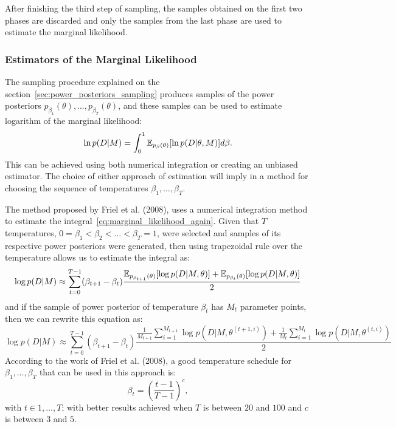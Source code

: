 After finishing the third step of sampling, the samples obtained on the
first two phases are discarded and only the samples from the last phase
are used to estimate the marginal likelihood.

\subsubsection{Estimators of the Marginal Likelihood}
The sampling procedure explained on the 
section~\ref{sec:power_posteriors_sampling} produces samples of the 
power posteriors $p_{\beta_1} (\theta), \ldots, p_{\beta_T} (\theta)$, 
and these samples can be used to estimate logarithm of the marginal 
likelihood:
\begin{equation}
    \ln p (D | M) = \int_0^1 \mathbb{E}_{p_\beta (\theta)} 
        [\ln p(D|\theta, M)]d\beta.
    \label{eq:marginal_likelihood_again}
\end{equation}
This can be achieved using both numerical integration or creating an
unbiased estimator. The choice of either approach of estimation will
imply in a method for choosing the sequence of temperatures $\beta_1, 
\ldots, \beta_T$. 

The method proposed by Friel et al. (2008), uses a numerical integration 
method to estimate the integral~\ref{eq:marginal_likelihood_again}. 
Given that $T$ temperatures, $0 = \beta_1 < \beta_2 < \ldots < \beta_T = 
1$, were selected and samples of its respective power posteriors were 
generated, then using trapezoidal rule over the temperature allows us to 
estimate the integral as:
\begin{equation*}
    \log{p(D| M)} \approx \sum_{t = 0}^{T - 1} (\beta_{t + 1} - \beta_t)
\frac{
    \mathbb{E}_{p_{\beta_{t + 1}} (\theta)}[\log p(D | M, \theta)]
+ 
    \mathbb{E}_{p_{\beta_{t}} (\theta)}[\log p(D | M, \theta)]}
{2}
\end{equation*}
and if the sample of power posterior of temperature $\beta_t$ has $M_t$
parameter points, then we can rewrite this equation as:
\begin{equation}
\log{p(D| M)} \approx \sum_{t = 0}^{T - 1} (\beta_{t + 1} - \beta_t)
\frac{
    \frac{1}{M_{t + 1}}
    \sum_{i = 1}^{M_{t + 1}}  \log p(D | M, \theta^{(t + 1, i)})
+ 
    \frac{1}{M_t}
    \sum_{i = 1}^{M_t}  \log p(D | M, \theta^{(t, i)})}
{2}
\end{equation}
According to the work of Friel et al. (2008), a good temperature 
schedule for $\beta_1, \ldots, \beta_T$ that can be used in this 
approach is:
\begin{equation*}
    \beta_t = \left(\frac{t - 1}{T - 1}\right)^{c}, 
\end{equation*}
with $t \in {1, \ldots, T}$; with better results achieved when $T$ is
between $20$ and $100$ and $c$ is between $3$ and $5$.

